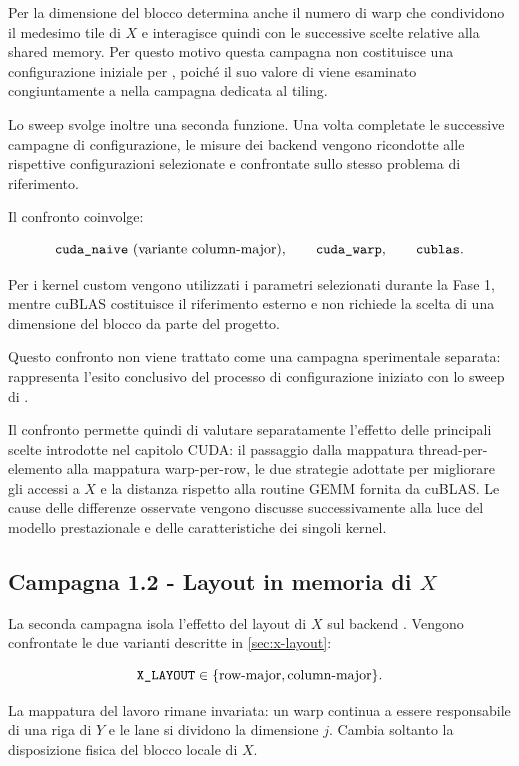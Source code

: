 Per  la dimensione del blocco determina anche
il numero di warp che condividono il medesimo tile di $X$ e interagisce
quindi con le successive scelte relative alla shared memory.
Per questo motivo questa campagna non costituisce una configurazione iniziale per
, poiché il suo valore di 
viene esaminato congiuntamente a  nella campagna
dedicata al tiling.

Lo sweep svolge inoltre una seconda funzione. Una volta completate le
successive campagne di configurazione, le misure dei backend vengono
ricondotte alle rispettive configurazioni selezionate e confrontate sullo
stesso problema di riferimento.

Il confronto coinvolge:

\[
\kernelname{cuda\_naive} \ (\text{variante column-major}),\qquad
\kernelname{cuda\_warp},\qquad
\kernelname{cublas}.
\]

Per i kernel custom vengono utilizzati i parametri selezionati durante
la Fase 1, mentre cuBLAS costituisce il riferimento esterno e non richiede
la scelta di una dimensione del blocco da parte del progetto.

Questo confronto non viene trattato come una campagna sperimentale
separata: rappresenta l'esito conclusivo del processo di configurazione
iniziato con lo sweep di .

Il confronto permette quindi di valutare separatamente l'effetto delle
principali scelte introdotte nel capitolo CUDA: il passaggio dalla
mappatura thread-per-elemento alla mappatura warp-per-row, le due strategie
adottate per migliorare gli accessi a $X$ e la distanza rispetto alla
routine GEMM fornita da cuBLAS. Le cause delle differenze osservate vengono
discusse successivamente alla luce del modello prestazionale e delle
caratteristiche dei singoli kernel.

\subsection{Campagna 1.2 - Layout in memoria di $X$}
\label{sec:camp-layout}

La seconda campagna isola l'effetto del layout di $X$ sul backend
. Vengono confrontate le due varianti descritte
in \cref{sec:x-layout}:

\[
\texttt{X\_LAYOUT}
\in
\{\text{row-major},\text{column-major}\}.
\]

La mappatura del lavoro rimane invariata: un warp continua a essere
responsabile di una riga di $Y$ e le lane si dividono la dimensione $j$.
Cambia soltanto la disposizione fisica del blocco locale di $X$.

